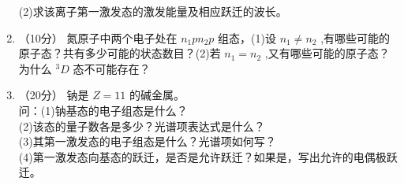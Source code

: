 \begin{enumerate}
(2)求该离子第一激发态的激发能量及相应跃迁的波长。
\item （10分）
氮原子中两个电子处在 $n_{1}pn_{2}p$ 组态，(1)设 $n_1\neq n_2$ ,有哪些可能的原子态？共有多少可能的状态数目？(2)若 $n_1=n_2$ ,又有哪些可能的原子态？为什么 $^{3}D$ 态不可能存在？
\item （20分） 
钠是 $Z=11$ 的碱金属。\\问：(1)钠基态的电子组态是什么？\\(2)该态的量子数各是多少？光谱项表达式是什么？\\(3)其第一激发态的电子组态是什么？光谱项如何写？\\(4)第一激发态向基态的跃迁，是否是允许跃迁？如果是，写出允许的电偶极跃迁。
\end{enumerate}